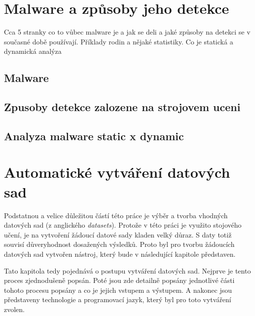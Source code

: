\chapter{Malware a způsoby jeho detekce} \label{2.chap}
Cca 5 stranky co to vůbec malware je a jak se deli a jaké způsoby na detekci se v současné době používají.
Příklady rodin a nějaké statistiky. Co je statická a dynamická analýza

\section{Malware}
\newpage
\section{Zpusoby detekce zalozene na strojovem uceni}
\newpage
\newpage
\section{Analyza malware static x dynamic}
\newpage

\chapter{Automatické vytváření datových sad} \label{3.chap}

Podstatnou a velice důležitou částí této práce je výběr a tvorba vhodných datových sad (z anglického \textit{datasets}).
Protože v této práci je využito stojového učení, je na vytvoření žádoucí datové sady kladen velký důraz. 
S daty totiž souvisí důveryhodnost dosažených výsledků.
Proto byl pro tvorbu žádoucích datových sad vytvořen nástroj, který bude v následující kapitole představen. 

Tato kapitola tedy pojednává o postupu vytváření datových sad. Nejprve je tento proces zjednodušeně popsán.
Poté jsou zde detailně popsány jednotlivé části tohoto procesu popsány a co je jejich vstupem a výstupem.
A nakonec jsou představeny technologie a programovací jazyk, který byl pro toto vytváření zvolen. 


